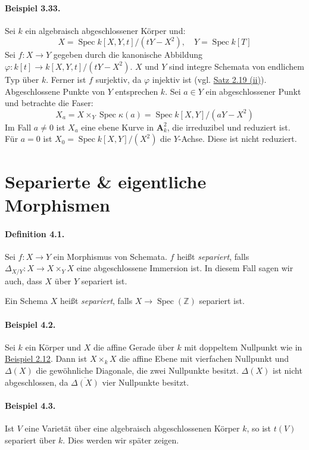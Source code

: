 \paragraph{Beispiel 3.33.}\label{3.33} Sei $k$ ein algebraisch abgeschlossener Körper und:
\[X=\operatorname{Spec}k[X,Y,t]/(tY-X^2),\quad Y=\operatorname{Spec}k[T] \]
Sei $f:X\to Y$ gegeben durch die kanonische Abbildung $\varphi:k[t]\to k[X,Y,t]/(tY-X^2)$. $X$ und $Y$ sind integre Schemata von endlichem Typ über $k$. Ferner ist $f$ surjektiv, da $\varphi$ injektiv ist (vgl. \hyperref[2.19]{Satz 2.19 (ii)}). Abgeschlossene Punkte von $Y$ entsprechen $k$. Sei $a\in Y$ ein abgeschlossener Punkt und betrachte die Faser: \[X_a=X\times_Y\operatorname{Spec}\kappa(a)=\operatorname{Spec}k[X,Y]/(aY-X^2)\]
Im Fall $a\neq 0$ ist $X_a$ eine ebene Kurve in $\mathbf{A}_k^2$, die irreduzibel und reduziert ist. Für $a=0$ ist $X_0=\operatorname{Spec}k[X,Y]/(X^2)$ die $Y$-Achse. Diese ist nicht reduziert.

\section{Separierte \& eigentliche Morphismen}

\paragraph{Definition 4.1.}\label{4.1} Sei $f:X\to Y$ ein Morphismus von Schemata. $f$ heißt \textit{separiert}, falls $\Delta_{X/Y}:X\to X\times_YX$ eine abgeschlossene Immersion ist. In diesem Fall sagen wir auch, dass $X$ über $Y$ separiert ist.

Ein Schema $X$ heißt \textit{separiert}, falls $X\to\operatorname{Spec}(\mathbb{Z})$ separiert ist.

\paragraph{Beispiel 4.2.}\label{4.2} Sei $k$ ein Körper und $X$ die affine Gerade über $k$ mit doppeltem Nullpunkt wie in \hyperref[2.12]{Beispiel 2.12}. Dann ist $X\times_kX$ die affine Ebene mit vierfachen Nullpunkt und $\Delta(X)$ die gewöhnliche Diagonale, die zwei Nullpunkte besitzt. $\Delta(X)$ ist nicht abgeschlossen, da $\overline{\Delta(X)}$ vier Nullpunkte besitzt.

\paragraph{Beispiel 4.3.}\label{4.3} Ist $V$ eine Varietät über eine algebraisch abgeschlossenen Körper $k$, so ist $t(V)$ separiert über $k$. Dies werden wir später zeigen.

